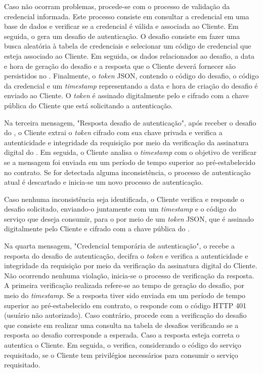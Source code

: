 Caso não ocorram problemas, procede-se com o processo de validação da credencial informada. Este processo consiste em consultar a credencial em uma base de dados e verificar se a credencial é válida e associada ao Cliente. Em seguida, o \servidorAA{} gera um desafio de autenticação. O desafio consiste em fazer uma busca aleatória à tabela de credenciais e selecionar um código de credencial que esteja associado ao Cliente. Em seguida, os dados relacionados ao desafio, a data e hora de geração do desafio e a resposta que o Cliente deverá fornecer são persistidos no \servidorBD{}. Finalmente, o \emph{token} JSON, contendo o código do desafio, o código da credencial e um \emph{timestamp} representando a data e hora de criação do desafio é enviado ao Cliente. O \emph{token} é assinado digitalmente pelo \servidorAA{} e cifrado com a chave pública do Cliente que está solicitando a autenticação.

Na terceira mensagem, "Resposta desafio de autenticação", após receber o desafio do \servidorAA{}, o Cliente extrai o \emph{token} cifrado com sua chave privada e verifica a autenticidade e integridade da requisição por meio da verificação da assinatura digital do \servidorAA{}.
Em seguida, o Cliente analisa o \emph{timestamp} com o objetivo de verificar se a mensagem foi enviada em um período de tempo superior ao pré-estabelecido no contrato. Se for detectada alguma inconsistência, o processo de autenticação atual é descartado e inicia-se um novo processo de autenticação.

Caso nenhuma inconsistência seja identificada, o Cliente verifica e responde o desafio solicitado, enviando-o
juntamente com um \emph{timestamp} e o código do serviço que deseja consumir, para o \servidorAA{} por meio de um \emph{token} JSON, que é assinado digitalmente pelo Cliente e cifrado com a chave pública do \servidorAA{}.

Na quarta mensagem, "Credencial temporária de autenticação", o \servidorAA{} recebe a resposta do desafio de autenticação, decifra o \emph{token} e verifica a autenticidade e integridade da requisição por meio da verificação da assinatura digital do Cliente. Não ocorrendo nenhuma violação, inicia-se o processo de verificação da resposta. A primeira verificação realizada refere-se ao tempo de geração do desafio, por meio do \emph{timestamp}. Se a resposta tiver sido enviada em um período de tempo superior ao pré-estabelecido em contrato, o \servidorAA{} responde com o código HTTP 401 (usuário não autorizado). Caso contrário, procede com a verificação do desafio que consiste em realizar uma consulta na tabela de desafios verificando se a resposta ao desafio corresponde a esperada. Caso a resposta esteja correta o \servidorAA{}
autentica o Cliente. Em seguida, o \servidorAA{} verifica, considerando o código do serviço requisitado, se o Cliente tem privilégios necessários para consumir o serviço requisitado.


